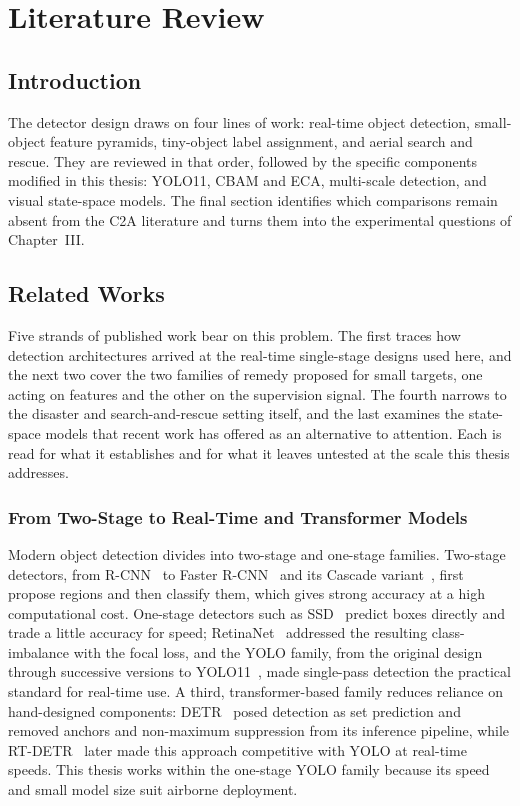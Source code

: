 \chapter{Literature Review}

\section{Introduction}
The detector design draws on four lines of work: real-time object detection,
small-object feature pyramids, tiny-object label assignment, and aerial search
and rescue. They are reviewed in that order, followed by the specific components
modified in this thesis: YOLO11, CBAM and ECA, multi-scale detection, and visual
state-space models. The final section identifies which comparisons remain absent
from the C2A literature and turns them into the experimental questions of
Chapter~III.

\section{Related Works}

Five strands of published work bear on this problem. The first traces how
detection architectures arrived at the real-time single-stage designs used here,
and the next two cover the two families of remedy proposed for small targets,
one acting on features and the other on the supervision signal. The fourth
narrows to the disaster and search-and-rescue setting itself, and the last
examines the state-space models that recent work has offered as an alternative
to attention. Each is read for what it establishes and for what it leaves
untested at the scale this thesis addresses.

\subsection{From Two-Stage to Real-Time and Transformer Models}
Modern object detection divides into two-stage and one-stage families. Two-stage
detectors, from R-CNN~\cite{girshick2014rcnn} to Faster R-CNN~\cite{ren2015fasterrcnn}
and its Cascade variant~\cite{cai2018cascade}, first propose regions and then
classify them, which gives strong accuracy at a high computational cost. One-stage
detectors such as SSD~\cite{liu2016ssd} predict boxes directly and trade a little
accuracy for speed; RetinaNet~\cite{lin2017focal} addressed the resulting
class-imbalance with the focal loss, and the YOLO family, from the original
design~\cite{redmon2016yolo} through successive versions
\cite{wang2023yolov7,
jocher2023yolov8,wang2024yolov9,wang2024yolov10}
to YOLO11~\cite{jocher2024yolo11}, made single-pass detection the practical standard
for real-time use. A third, transformer-based family reduces reliance on
hand-designed components: DETR~\cite{carion2020detr} posed detection as set
prediction and removed anchors and non-maximum suppression from its inference
pipeline, while RT-DETR~\cite{zhao2024rtdetr} later made this approach
competitive with YOLO at real-time speeds. This thesis works within the one-stage
YOLO family because its speed and small model size suit airborne deployment.

